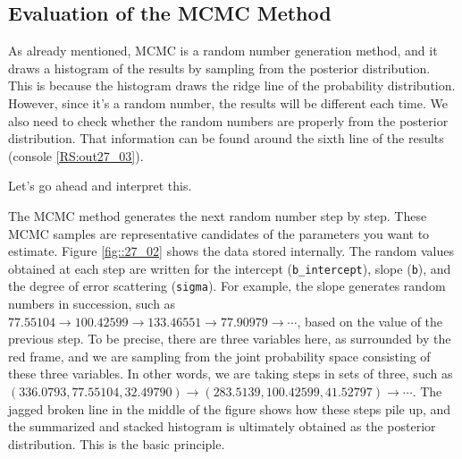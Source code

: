 \documentclass{ltjsarticle}
\begin{document}
\subsection{Evaluation of the MCMC Method}
As already mentioned, MCMC is a random number generation method, and it draws a histogram of the results by sampling from the posterior distribution. This is because the histogram draws the ridge line of the probability distribution. However, since it's a random number, the results will be different each time. We also need to check whether the random numbers are properly from the posterior distribution. That information can be found around the sixth line of the results (console \ref{RS:out27_03}).

Let's go ahead and interpret this.

The MCMC method generates the next random number step by step. These MCMC samples are representative candidates of the parameters you want to estimate. Figure \ref{fig::27_02} shows the data stored internally. The random values obtained at each step are written for the intercept (\verb|b_intercept|), slope (\texttt{b}), and the degree of error scattering (\texttt{sigma}). For example, the slope generates random numbers in succession, such as $77.55104 \to 100.42599 \to 133.46551 \to 77.90979 \to \cdots$, based on the value of the previous step. To be precise, there are three variables here, as surrounded by the red frame, and we are sampling from the joint probability space consisting of these three variables. In other words, we are taking steps in sets of three, such as $(336.0793,77.55104,32.49790)\to (283.5139,100.42599,41.52797) \to \cdots$. The jagged broken line in the middle of the figure shows how these steps pile up, and the summarized and stacked histogram is ultimately obtained as the posterior distribution. This is the basic principle.
\end{document}
